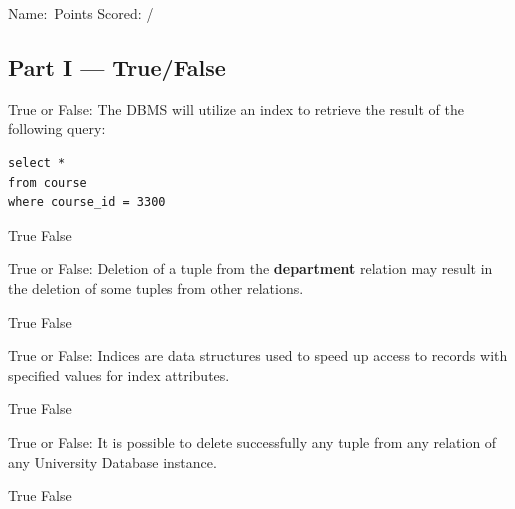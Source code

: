 \documentclass[12pt, addpoints, answers]{exam}
\begin{document}
\noindent Name:\ \makebox[3in]{\hrulefill}\hfill Points Scored: \underline{\hspace{3em}} / \numpoints
\begin{questions}

\section*{Part I — True/False}

\begin{minipage}{\linewidth}
\question[2]
True or False: The DBMS will utilize an index to retrieve the result of the following query:\par
\begin{verbatim}
select * 
from course
where course_id = 3300
\end{verbatim}
\begin{checkboxes}
    \choice True
    \CorrectChoice False
\end{checkboxes}
\end{minipage}\vspace{1em}

\begin{minipage}{\linewidth}
\question[2]
True or False: Deletion of a tuple from the \textbf{department} relation may result in the deletion of some tuples from other relations.\par\vspace{0.5em}
\begin{checkboxes}
    \choice True
    \CorrectChoice False
\end{checkboxes}
\end{minipage}\vspace{1em}

\begin{minipage}{\linewidth}
\question[2]
True or False: Indices are data structures used to speed up access to records with specified values for index attributes.\par\vspace{0.5em}
\begin{checkboxes}
    \CorrectChoice True
    \choice False
\end{checkboxes}
\end{minipage}\vspace{1em}

\begin{minipage}{\linewidth}
\question[2]
True or False: It is possible to delete successfully any tuple from any relation of any University Database instance.\par\vspace{0.5em}
\begin{checkboxes}
    \choice True
    \CorrectChoice False
\end{checkboxes}
\end{minipage}\vspace{1em}


\end{questions}
\end{document}
